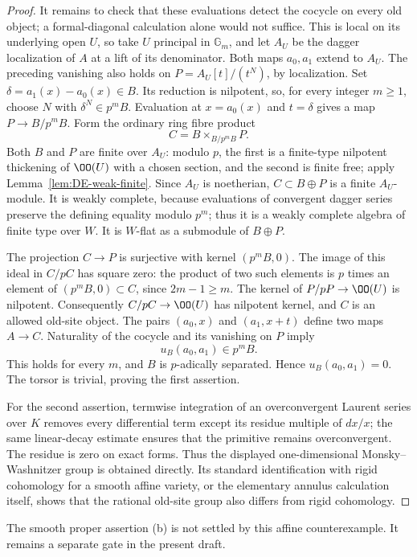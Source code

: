\begin{proof}
It remains to check that these evaluations detect the cocycle on every old object; a formal-diagonal calculation alone would not suffice.  This is local on its underlying open $U$, so take $U$ principal in $\mathbb G_m$, and let $A_U$ be the dagger localization of $A$ at a lift of its denominator.  Both maps $a_0,a_1$ extend to $A_U$.  The preceding vanishing also holds on
$P=A_U[t]/(t^N)$, by localization.  Set $\delta=a_1(x)-a_0(x)\in B$.  Its reduction is nilpotent, so, for every integer $m\geq1$, choose $N$ with $\delta^N\in p^mB$.  Evaluation at $x=a_0(x)$ and $t=\delta$ gives a map $P\to B/p^mB$.  Form the ordinary ring fibre product
\[
                         C=B\times_{B/p^mB}P.
\]
Both $B$ and $P$ are finite over $A_U$: modulo $p$, the first is a finite-type nilpotent thickening of $\OO(U)$ with a chosen section, and the second is finite free; apply Lemma~\ref{lem:DE-weak-finite}.  Since $A_U$ is noetherian, $C\subset B\oplus P$ is a finite $A_U$-module.  It is weakly complete, because evaluations of convergent dagger series preserve the defining equality modulo $p^m$; thus it is a weakly complete algebra of finite type over $W$.  It is $W$-flat as a submodule of $B\oplus P$.

The projection $C\to P$ is surjective with kernel $(p^mB,0)$.  The image of this ideal in $C/pC$ has square zero: the product of two such elements is $p$ times an element of $(p^mB,0)\subset C$, since $2m-1\geq m$.  The kernel of $P/pP\to\OO(U)$ is nilpotent.  Consequently $C/pC\to\OO(U)$ has nilpotent kernel, and $C$ is an allowed old-site object.  The pairs $(a_0,x)$ and $(a_1,x+t)$ define two maps $A\to C$.  Naturality of the cocycle and its vanishing on $P$ imply
\[
                         u_B(a_0,a_1)\in p^mB.
\]
This holds for every $m$, and $B$ is $p$-adically separated.  Hence $u_B(a_0,a_1)=0$.  The torsor is trivial, proving the first assertion.

For the second assertion, termwise integration of an overconvergent Laurent series over $K$ removes every differential term except its residue multiple of $dx/x$; the same linear-decay estimate ensures that the primitive remains overconvergent.  The residue is zero on exact forms.  Thus the displayed one-dimensional Monsky--Washnitzer group is obtained directly.  Its standard identification with rigid cohomology for a smooth affine variety, or the elementary annulus calculation itself, shows that the rational old-site group also differs from rigid cohomology.
\end{proof}

The smooth proper assertion (b) is not settled by this affine counterexample.  It remains a separate gate in the present draft.
